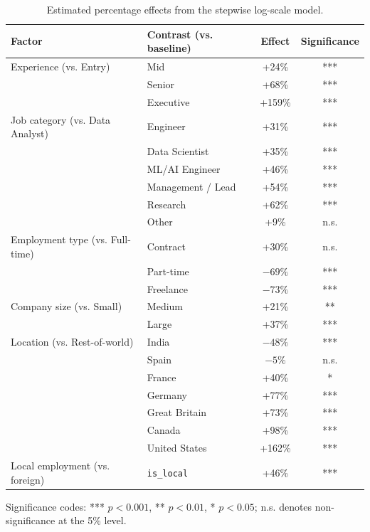 \begin{table}[htbp]
    \centering
    \caption{Estimated percentage effects from the stepwise log-scale model.}
    \label{tab:driver-effects}
    \small
    \begin{tabular}{llcc}
        \toprule
        \textbf{Factor} & \textbf{Contrast (vs. baseline)}
            & \textbf{Effect} & \textbf{Significance} \\
        \midrule
        Experience (vs. Entry)
            & Mid       & +24\%  & *** \\
            & Senior    & +68\%  & *** \\
            & Executive & +159\% & *** \\
        \addlinespace[0.35em]
        Job category (vs. Data Analyst)
            & Engineer          & +31\% & ***  \\
            & Data Scientist    & +35\% & *** \\
            & ML/AI Engineer    & +46\% & *** \\
            & Management / Lead & +54\% & *** \\
            & Research          & +62\% & *** \\
            & Other             & +9\%  & n.s. \\
        \addlinespace[0.35em]
        Employment type (vs. Full-time)
            & Contract  & +30\%   & n.s. \\
            & Part-time & $-69\%$ & *** \\
            & Freelance & $-73\%$ & *** \\
        \addlinespace[0.35em]
        Company size (vs. Small)
            & Medium & +21\% & ** \\
            & Large  & +37\% & *** \\
        \addlinespace[0.35em]
        Location (vs. Rest-of-world)
            & India         & $-48\%$ & *** \\
            & Spain         & $-5\%$  & n.s. \\
            & France        & +40\%   & *   \\
            & Germany       & +77\%   & *** \\
            & Great Britain & +73\%   & *** \\
            & Canada        & +98\%   & *** \\
            & United States & +162\%  & *** \\
        \addlinespace[0.35em]
        Local employment (vs. foreign)
            & \texttt{is\_local} & +46\% & *** \\
        \bottomrule
    \end{tabular}

    \vspace{0.4em}
    \begin{minipage}{0.92\textwidth}
        \footnotesize
        Significance codes: *** $p<0.001$, ** $p<0.01$, * $p<0.05$;
        n.s. denotes non-significance at the 5\% level.
    \end{minipage}
\end{table}

